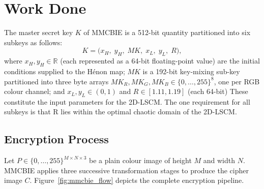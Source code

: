 \section{Work Done}
\label{sec:lad-work}


The master secret key $K$ of MMCBIE is a 512-bit quantity partitioned
into six subkeys as follows:
\begin{equation}
    K = \bigl(x_H,\; y_H,\; MK,\; x_L,\; y_L,\; R\bigr),
    \label{eq:key_structure}
\end{equation}
where $x_H, y_H \in \mathbb{R}$ (each represented as a 64-bit
floating-point value) are the initial conditions supplied to the
H\'enon map; $MK$ is a 192-bit key-mixing sub-key partitioned into
three byte arrays
$MK_R, MK_G, MK_B \in \{0,\ldots,255\}^8$, one per RGB colour channel;
and $x_L, y_L \in (0,1)$ and $R \in [1.11, 1.19]$ (each 64-bit)
These constitute the input parameters for the 2D-LSCM.
The one requirement for all subkeys is that R lies within the
optimal chaotic domain of the 2D-LSCM.
\subsection{Encryption Process}
\label{subsec:encryption}

Let $P \in \{0,\ldots,255\}^{M \times N \times 3}$ be a plain colour
image of height $M$ and width $N$.
MMCBIE applies three successive transformation stages to produce the
cipher image $C$. Figure~\ref{fig:mmcbie_flow} depicts the complete
encryption pipeline.

